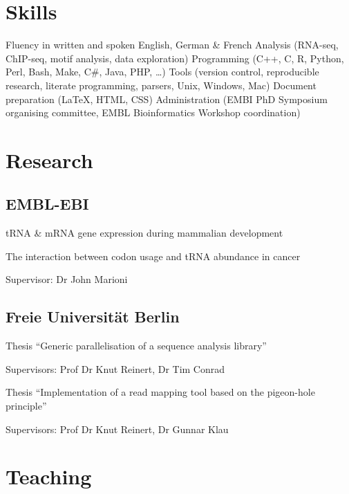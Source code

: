 \documentclass{klmr-cv}
\newcommand*\csharp{C\#}
\newcommand*\cpp{C++}
\begin{document}
\section{Skills}

\begin{itemize}
    \listitem Fluency in written and spoken English, German \& French
    \listitem Analysis (RNA-seq, ChIP-seq, motif analysis, data exploration)
    \listitem Programming (\cpp, C, R, Python, Perl, Bash, Make, \csharp, Java,
        PHP, …)
    \listitem Tools (version control, reproducible research, literate
        programming, parsers, Unix, Windows, Mac)
    \listitem Document preparation (\LaTeX, HTML, CSS)
    \listitem Administration (EMBI PhD Symposium organising committee,
        EMBL Bioinformatics Workshop coordination)
\end{itemize}

\body

\section{Research}

\subsection{EMBL-EBI}

\date{2011--2014}
\item{tRNA \& mRNA gene expression during mammalian development}
\date{2014--2015}
\item{The interaction between codon usage and tRNA abundance in cancer}
\item{Supervisor: Dr John Marioni}

\subsection{Freie Universität Berlin}

\date{2010--2011}
\item{Thesis “Generic parallelisation of a sequence analysis library”}
\item{Supervisors: Prof Dr Knut Reinert, Dr Tim Conrad}
\date{2008}
\item{Thesis “Implementation of a read mapping tool based on the pigeon-hole
    principle”}
\item{Supervisors: Prof Dr Knut Reinert, Dr Gunnar Klau}

\section{Teaching}
\end{document}
